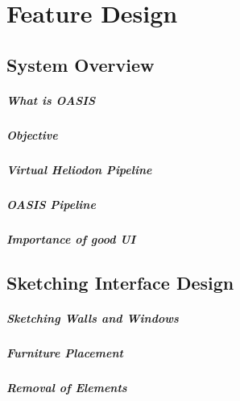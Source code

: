 \chapter{Feature Design} \label{sec:feature}

	\section{System Overview}
		\paragraph{What is OASIS}
		\paragraph{Objective}
		\paragraph{Virtual Heliodon Pipeline}
		\paragraph{OASIS Pipeline}
		\paragraph{Importance of good UI}

	\section{Sketching Interface Design}
		\paragraph{Sketching Walls and Windows}
		\paragraph{Furniture Placement}
		\paragraph{Removal of Elements}
